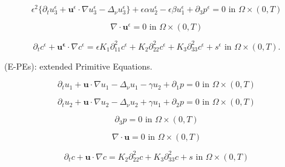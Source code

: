 \documentclass[11pt]{article}
\begin{document}
    \begin{equation} \label{ANSC3-dw}
    \epsilon^2 \{  \partial_t u_3^\epsilon + \mathbf{u}^\epsilon \cdot \nabla u_3^\epsilon -\Delta_\nu u_3^{\epsilon} \} + \epsilon \alpha u^\epsilon_2 - \epsilon \beta u_1^\epsilon + \partial_3 p^\epsilon = 0 \text{ in } \Omega \times (0,T)
    \end{equation}
    
    \begin{equation} \label{ANSC4-dw}
    \nabla \cdot \mathbf{u}^\epsilon= 0 \text{ in } \Omega \times (0,T)
    \end{equation}
    
    \begin{equation} \label{ANSC5-dw}
    \partial_t c^\epsilon + \mathbf{u^\epsilon} \cdot \nabla c^\epsilon = \epsilon K_1 \partial_{11} ^ 2 c^\epsilon + K_2 \partial_{22} ^ 2 c^\epsilon + K_3 \partial_{33} ^ 2 c^\epsilon + s^\epsilon \text{ in } \Omega \times (0,T).
    \end{equation}
    

(E-PEs): extended Primitive Equations.

    \begin{equation} \label{HNSC1-dw}    
    \partial_t u_1 + \mathbf{u} \cdot \nabla u_1 - \Delta_\nu u_1 - \gamma u_2 + \partial_1 p = 0 \text{ in } \Omega \times (0,T)
    \end{equation}
    
    \begin{equation} \label{HNSC2-dw}   
    \partial_t u_2 + \mathbf{u} \cdot \nabla u_2 - \Delta_\nu u_2 + \gamma u_1 + \partial_2 p = 0 \text{ in } \Omega \times (0,T)
    \end{equation}
    
    \begin{equation} \label{HNSC3-dw}   
    \partial_3 p = 0 \text{ in } \Omega \times (0,T)
    \end{equation}
    
    \begin{equation} \label{HNSC4-dw}   
    \nabla \cdot \mathbf{u} = 0 \text{ in } \Omega \times (0,T)
    \end{equation}
    
    \begin{equation} \label{HNSC5-dw}   
    \partial_t c + \mathbf{u} \cdot \nabla c = K_2 \partial_{22} ^ 2 c + K_3 \partial_{33} ^2 c + s \text{ in } \Omega \times (0,T)
    \end{equation}
    
\end{document}
